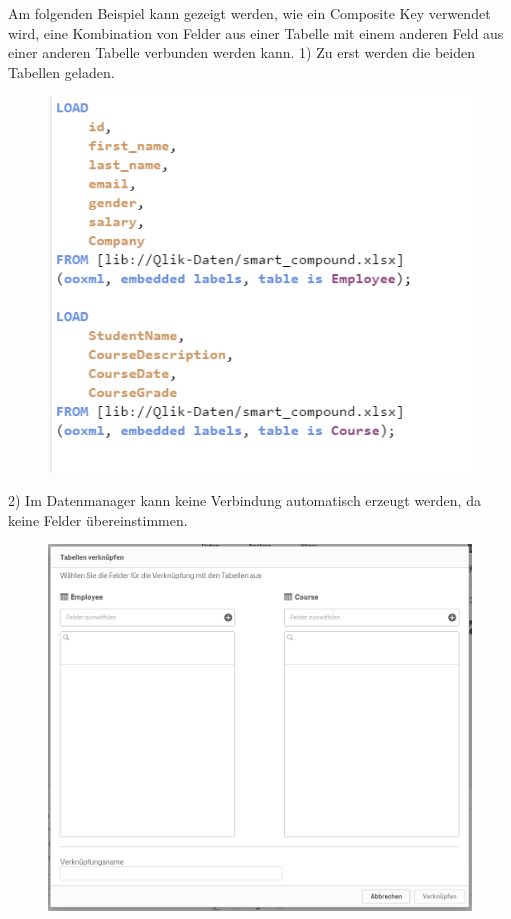 Am folgenden Beispiel kann gezeigt werden, wie ein Composite Key verwendet wird, eine Kombination von Felder aus einer Tabelle mit einem anderen Feld aus einer anderen Tabelle verbunden werden kann.
1) Zu erst werden die beiden Tabellen geladen.
\begin{figure}[H]
	\centering
	\includegraphics[scale = 0.3]{attachment/chapter_3/Scc019}
	\caption{}
	\label{fig:Scc019}
\end{figure}

2) Im Datenmanager kann keine Verbindung automatisch erzeugt werden, da keine Felder übereinstimmen.
\begin{figure}[H]
	\centering
	\includegraphics[scale = 0.3]{attachment/chapter_3/Scc020}
	\caption{}
	\label{fig:Scc020}
\end{figure}

